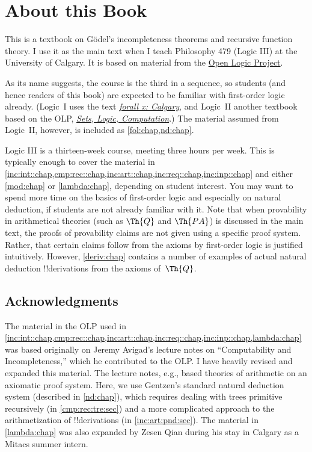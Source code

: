 
\chapter{About this Book}

This is a textbook on G\"odel's incompleteness theorems and recursive
function theory. I use it as the main text when I teach Philosophy 479
(Logic III) at the University of Calgary. It is based on material from the
\href{https://openlogicproject.org}{Open Logic Project}.

As its name suggests, the course is the third in a sequence, so
students (and hence readers of this book) are expected to be familiar
with first-order logic already.  (Logic~I uses the text
\href{https://forallx.openlogicproject.org}{\emph{forall x: Calgary}},
and Logic~II another textbook based on the OLP,
\href{https://slc.openlogicproject.org}{\emph{Sets, Logic,
Computation}}.) The material assumed from Logic~II, however, is
included as \cref{fol:chap,nd:chap}.

Logic III is a thirteen-week course, meeting three hours per week.
This is typically enough to cover the material in
\cref{inc:int::chap,cmp:rec::chap,inc:art::chap,inc:req::chap,inc:inp::chap}
and either \cref{mod:chap} or \cref{lambda:chap}, depending on student
interest. You may want to spend more time on the basics of
first-order logic and especially on natural deduction, if students are
not already familiar with it. Note that when provability in
arithmetical theories (such as $\Th{Q}$ and $\Th{PA}$) is discussed in
the main text, the proofs of provability claims are not given using a
specific proof system. Rather, that certain claims follow from the
axioms by first-order logic is justified intuitively. However,
\cref{deriv:chap} contains a number of examples of actual natural
deduction !!{derivation}s from the axioms of~$\Th{Q}$.

\section*{Acknowledgments}

The material in the OLP used in
\cref{inc:int::chap,cmp:rec::chap,inc:art::chap,inc:req::chap,inc:inp::chap,lambda:chap}
was based originally on Jeremy Avigad's lecture notes on
``Computability and Incompleteness,'' which he contributed to the OLP.
I have heavily revised and expanded this material. The lecture notes,
e.g., based theories of arithmetic on an axiomatic proof system. Here,
we use Gentzen's standard natural deduction system (described in
\cref{nd:chap}), which requires dealing with trees primitive
recursively (in \cref{cmp:rec:tre:sec}) and a more complicated
approach to the arithmetization of !!{derivation}s (in
\cref{inc:art:pnd:sec}). The material in \cref{lambda:chap} was also
expanded by Zesen Qian during his stay in Calgary as a Mitacs summer
intern.

